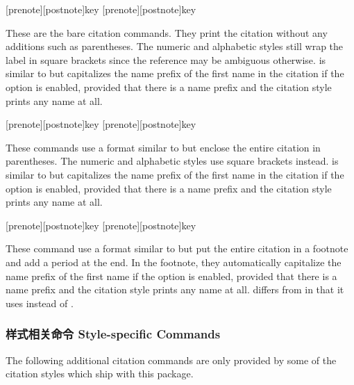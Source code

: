 \begin{ltxsyntax}

[prenote][postnote]{key}
[prenote][postnote]{key}

These are the bare citation commands. They print the citation without any additions such as parentheses. The numeric and alphabetic styles still wrap the label in square brackets since the reference may be ambiguous otherwise.  is similar to  but capitalizes the name prefix of the first name in the citation if the  option is enabled, provided that there is a name prefix and the citation style prints any name at all.

[prenote][postnote]{key}
[prenote][postnote]{key}

These commands use a format similar to  but enclose the entire citation in parentheses. The numeric and alphabetic styles use square brackets instead.  is similar to  but capitalizes the name prefix of the first name in the citation if the  option is enabled, provided that there is a name prefix and the citation style prints any name at all.

[prenote][postnote]{key}
[prenote][postnote]{key}

These command use a format similar to  but put the entire citation in a footnote and add a period at the end. In the footnote, they automatically capitalize the name prefix of the first name if the  option is enabled, provided that there is a name prefix and the citation style prints any name at all.  differs from  in that it uses  instead of .

\end{ltxsyntax}

\subsubsection{样式相关命令 Style-specific Commands}
\label{use:cit:cbx}

The following additional citation commands are only provided by some of the citation styles which ship with this package.

